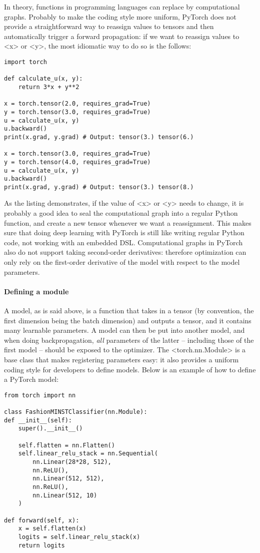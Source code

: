 \documentclass[hyperref, a4paper, 12pt]{report}
\def\texttt#1{<#1>}%
\newcommand{\shortcode}[1]{\texttt{#1}}
\begin{document}
In theory, functions in programming languages can replace by computational graphs.
Probably to make the coding style more uniform,
PyTorch does not provide a straightforward way to reassign values to tensors
and then automatically trigger a forward propagation:
if we want to reassign values to \shortcode{x} or \shortcode{y},
the most idiomatic way to do so is the follows:

\begin{lstlisting}
import torch 

def calculate_u(x, y):
    return 3*x + y**2

x = torch.tensor(2.0, requires_grad=True)
y = torch.tensor(3.0, requires_grad=True)
u = calculate_u(x, y)
u.backward()
print(x.grad, y.grad) # Output: tensor(3.) tensor(6.)

x = torch.tensor(3.0, requires_grad=True)
y = torch.tensor(4.0, requires_grad=True)
u = calculate_u(x, y)
u.backward()
print(x.grad, y.grad) # Output: tensor(3.) tensor(8.)
\end{lstlisting}

As the listing demonstrates, if the value of \shortcode{x} or \shortcode{y} needs to change,
it is probably a good idea to seal the computational graph into a regular Python function,
and create a new tensor whenever we want a reassignment.
This makes sure that doing deep learning with PyTorch is still like writing regular Python code,
not working with an embedded DSL.
Computational graphs in PyTorch also do not support taking second-order derivatives:
therefore optimization can only rely on the first-order derivative of the model with respect to the model parameters.

\paragraph*{Defining a module}
A model, as is said above, is a function that takes in a tensor (by convention, the first dimension being the batch dimension) and outputs a tensor,
and it contains many learnable parameters.
A model can then be put into another model,
and when doing backpropagation,
\emph{all} parameters of the latter -- including those of the first model -- 
should be exposed to the optimizer.
The \shortcode{torch.nn.Module} is a base class that makes registering parameters easy:
it also provides a uniform coding style for developers to define models.
Below is an example of how to define a PyTorch model:

\begin{lstlisting}
from torch import nn 

class FashionMINSTClassifier(nn.Module):
def __init__(self):
    super().__init__()
    
    self.flatten = nn.Flatten()
    self.linear_relu_stack = nn.Sequential(
        nn.Linear(28*28, 512),
        nn.ReLU(),
        nn.Linear(512, 512),
        nn.ReLU(),
        nn.Linear(512, 10)
    )
    
def forward(self, x):
    x = self.flatten(x)
    logits = self.linear_relu_stack(x)
    return logits
\end{lstlisting}
\end{document}
